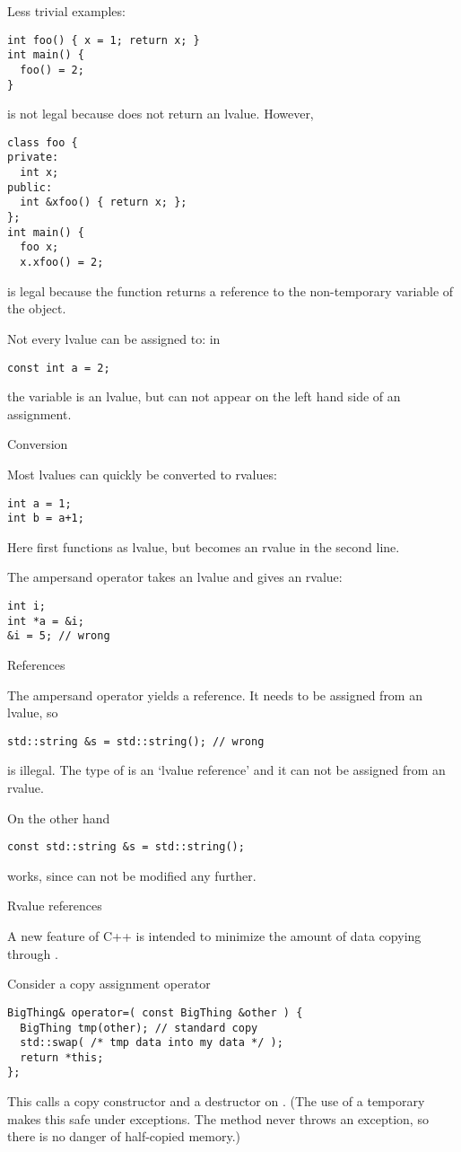 Less trivial examples:
\begin{lstlisting}
int foo() { x = 1; return x; }
int main() {
  foo() = 2;
}
\end{lstlisting}
is not legal because  does not return an lvalue. However,
\begin{lstlisting}
class foo {
private:
  int x;
public:
  int &xfoo() { return x; };
};
int main() {
  foo x;
  x.xfoo() = 2;
\end{lstlisting}
is legal because the function  returns a reference to the
non-temporary variable  of the  object.

Not every lvalue can be assigned to: in
\begin{lstlisting}
const int a = 2;
\end{lstlisting}
the variable  is an lvalue, but can not appear on the left hand
side of an assignment.

 {Conversion}

Most lvalues can quickly be converted to rvalues:
\begin{lstlisting}
int a = 1;
int b = a+1;
\end{lstlisting}
Here  first functions as lvalue, but becomes an rvalue in the
second line.

The ampersand operator takes an lvalue and gives an rvalue:
\begin{lstlisting}
int i;
int *a = &i;
&i = 5; // wrong
\end{lstlisting}

 {References}

The ampersand operator yields a reference. It needs to be assigned
from an lvalue, so
\begin{lstlisting}
std::string &s = std::string(); // wrong
\end{lstlisting}
is illegal. The type of  is an `lvalue reference' and it can not
be assigned from an rvalue.

On the other hand
\begin{lstlisting}
const std::string &s = std::string();
\end{lstlisting}
works, since  can not be modified any further.

 {Rvalue references}
\label{sec:rvalue-ref}

A new feature of C++ is
intended to minimize the amount of data copying through
.

Consider a copy assignment operator
\begin{lstlisting}
BigThing& operator=( const BigThing &other ) {
  BigThing tmp(other); // standard copy
  std::swap( /* tmp data into my data */ );
  return *this;
};
\end{lstlisting}
This calls a copy constructor and a destructor on . (The use of
a temporary makes this safe under exceptions. The 
method never throws an exception, so there is no danger of half-copied
memory.)

